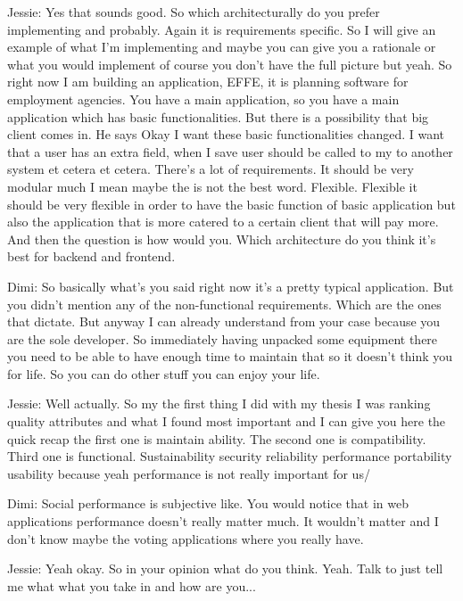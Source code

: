Jessie: Yes that sounds good. So which architecturally do you prefer implementing and probably. Again it is requirements specific. So I will give an example of what I'm implementing and maybe you can give you a rationale or what you would implement of course you don't have the full picture but yeah. So right now I am building an application, EFFE, it is planning software for employment agencies. You have a main application, so you have a main application which has basic functionalities. But there is a possibility that big client comes in. He says Okay I want these basic functionalities changed. I want that a user has an extra field, when I save user should be called to my to another system et cetera et cetera. There's a lot of requirements. It should be very modular much I mean maybe the is not the best word. Flexible. Flexible it should be very flexible in order to have the basic function of basic application but also the application that is more catered to a certain client that will pay more. And then the question is how would you. Which architecture do you think it's best for backend and frontend.

Dimi: So basically what's you said right now it's a pretty typical application. But you didn't mention any of the non-functional requirements. Which are the ones that dictate. But anyway I can already understand from your case because you are the sole developer. So immediately having unpacked some equipment there you need to be able to have enough time to maintain that so it doesn't think you for life. So you can do other stuff you can enjoy your life.

Jessie: Well actually. So my the first thing I did with my thesis I was ranking quality attributes and what I found most important and I can give you here the quick recap the first one is maintain ability. The second one is compatibility. Third one is functional. Sustainability security reliability performance portability usability because yeah performance is not really important for us/

Dimi: Social performance is subjective like. You would notice that in web applications performance doesn't really matter much. It wouldn't matter and I don't know maybe the voting applications where you really have.

Jessie: Yeah okay. So in your opinion what do you think. Yeah. Talk to just tell me what what you take in and how are you...

